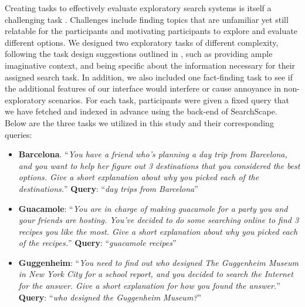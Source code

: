 Creating tasks to effectively evaluate exploratory search systems is itself a challenging task \cite{kules2008creating,white2006report}. Challenges include finding topics that are unfamiliar yet still relatable for the participants and motivating participants to explore and evaluate different options. We designed two exploratory tasks of different complexity, following the task design suggestions outlined in \cite{kules2008creating}, such as providing ample imaginative context, and being specific about the information necessary for their assigned search task. In addition, we also included one fact-finding task to see if the additional features of our interface would interfere or cause annoyance in non-exploratory scenarios. For each task, participants were given a fixed query that we have fetched and indexed in advance using the back-end of SearchScape. Below are the three tasks we utilized in this study and their corresponding queries:

\begin{itemize}
    \setlength\itemsep{0.0em}
    \item \textbf{Barcelona}. ``\emph{You have a friend who's planning a day trip from Barcelona, and you want to help her figure out 3 destinations that you considered the best options. Give a short explanation about why you picked each of the destinations.}'' \textbf{Query}: ``\emph{day trips from Barcelona}''
    \item \textbf{Guacamole}: ``\emph{You are in charge of making guacamole for a party you and your friends are hosting. You've decided to do some searching online to find 3 recipes you like the most.  Give a short explanation about why you picked each of the recipes.}'' \textbf{Query}: ``\emph{guacamole recipes}''
    \item \textbf{Guggenheim}: ``\emph{You need to find out who designed The Guggenheim Museum in New York City for a school report, and you decided to search the Internet for the answer. Give a short explanation for how you found the answer.}'' \textbf{Query}: ``\emph{who designed the Guggenheim Museum?}''
\end{itemize}

